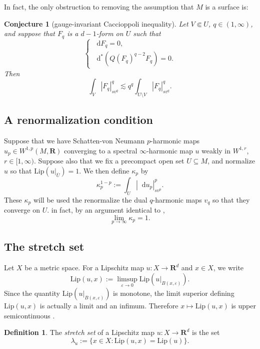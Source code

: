 \documentclass[reqno,11pt]{amsart}
\newcommand{\RR}{\mathbf{R}}
\newcommand*\dif{\mathop{}\!\mathrm{d}}
\newcommand{\Lip}{\mathrm{Lip}}
\newcommand{\dfn}[1]{\emph{#1}\index{#1}}
\newtheorem{conjecture}[theorem]{Conjecture}
\theoremstyle{definition}
\newtheorem{definition}[theorem]{Definition}
\numberwithin{equation}{section}
\begin{document}
In fact, the only obstruction to removing the assumption that $M$ is a surface is:

\begin{conjecture}[gauge-invariant Caccioppoli inequality]
Let $V \Subset U$, $q \in (1, \infty)$, and suppose that $F_q$ is a $d - 1$-form on $U$ such that 
$$\begin{cases}
  \dif F_q = 0, \\
  \dif^*(Q(F_q)^{q - 2} F_q) = 0.
\end{cases}$$
Then 
$$\int_V |F_q|_{sv^q}^q \lesssim q^q \int_{U \setminus V} |F_q|_{sv^q}^q.$$
\end{conjecture}

\subsection{A renormalization condition}
Suppose that we have Schatten-von Neumann $p$-harmonic maps $u_p \in W^{1, p}(M, \RR)$ converging to a spectral $\infty$-harmonic map $u$ weakly in $W^{1, r}$, $r \in [1, \infty)$.
Suppose also that we fix a precompact open set $U \subseteq M$, and normalize $u$ so that $\Lip(u|_{\overline U}) = 1$.
We then define $\kappa_p$ by 
\begin{equation}\label{normalization condition}
\kappa_p^{1 - p} := \int_U |\dif u_p|_{sv^p}^p.
\end{equation}
These $\kappa_p$ will be used the renormalize the dual $q$-harmonic maps $v_q$ so that they converge on $U$.
in fact, by an argument identical to \cite[Lemma 6.1]{daskalopoulos2022analytic},
\begin{equation}\label{convergence of normalizations}
\lim_{p \to \infty} \kappa_p = 1.
\end{equation}

\subsection{The stretch set}
Let $X$ be a metric space.
For a Lipschitz map $u: X \to \RR^d$ and $x \in X$, we write 
$$\Lip(u, x) := \limsup_{\varepsilon \to 0} \Lip(u|_{B(x, \varepsilon)}).$$
Since the quantity $\Lip(u|_{B(x, \varepsilon)})$ is monotone, the limit superior defining $\Lip(u, x)$ is actually a limit and an infimum.
Therefore $x \mapsto \Lip(u, x)$ is upper semicontinuous \cite[Lemma 4.2]{Crandall2008}.

\begin{definition}
The \dfn{stretch set} of a Lipschitz map $u: X \to \RR^d$ is the set 
$$\lambda_u := \{x \in X: \Lip(u, x) = \Lip(u)\}.$$
\end{definition}
\end{document}
